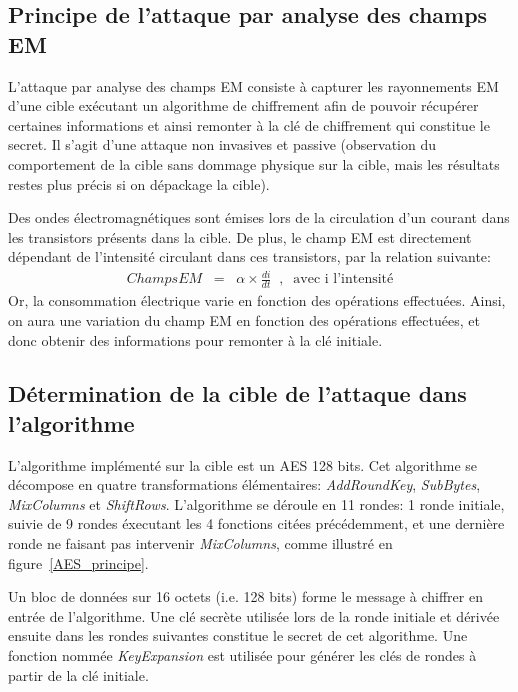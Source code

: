 \documentclass[a4paper, 12pt]{article}
\begin{document}
	\subsection{Principe de l'attaque par analyse des champs EM}
	L'attaque par analyse des champs EM consiste à capturer les rayonnements EM d'une cible exécutant un algorithme de chiffrement afin de pouvoir récupérer certaines informations et ainsi remonter à la clé de chiffrement qui constitue le secret. Il s'agit d'une attaque non invasives et passive (observation du comportement de la cible sans dommage physique sur la cible, mais les résultats restes plus précis si on dépackage la cible). 
	
	Des ondes électromagnétiques sont émises lors de la circulation d'un courant dans les transistors présents dans la cible. De plus, le champ EM est directement dépendant de l'intensité circulant dans ces transistors, par la relation suivante:
	\begin{align*}
		Champs EM \;\; = \;\; \alpha \times \frac{di}{dt} \;\; , \;\; \textrm{avec i l'intensité}
	\end{align*}
Or, la consommation électrique varie en fonction des opérations effectuées. Ainsi, on aura une variation du champ EM en fonction des opérations effectuées, et donc obtenir des informations pour remonter à la clé initiale. 

	\subsection{Détermination de la cible de l'attaque dans l'algorithme}
	L'algorithme implémenté sur la cible est un AES 128 bits. Cet algorithme se décompose en quatre transformations élémentaires: \emph{AddRoundKey}, \emph{SubBytes}, \emph{MixColumns} et \emph{ShiftRows}. L'algorithme se déroule en 11 rondes: 1 ronde initiale, suivie de 9 rondes éxecutant les 4 fonctions citées précédemment, et une dernière ronde ne faisant pas intervenir \emph{MixColumns}, comme illustré en figure~\ref{AES_principe}.
	
	Un bloc de données sur 16 octets (i.e. 128 bits) forme le message à chiffrer en entrée de l'algorithme. Une clé secrète utilisée lors de la ronde initiale et dérivée ensuite dans les rondes suivantes constitue le secret de cet algorithme. Une fonction nommée \emph{KeyExpansion} est utilisée pour générer les clés de rondes à partir de la clé initiale. 
\end{document}
